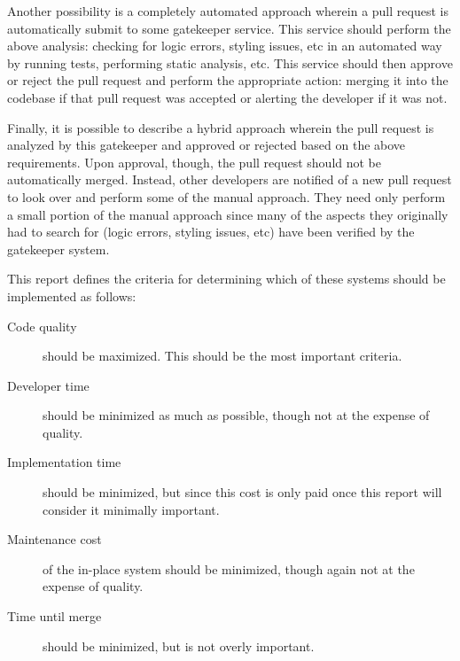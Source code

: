 \documentclass[12pt]{article}
\begin{document}
Another possibility is a completely automated approach wherein a pull request is automatically submit to some gatekeeper service. This service should perform the above analysis: checking for logic errors, styling issues, etc in an automated way by running tests, performing static analysis, etc. This service should then approve or reject the pull request and perform the appropriate action: merging it into the codebase if that pull request was accepted or alerting the developer if it was not.

Finally, it is possible to describe a hybrid approach wherein the pull request is analyzed by this gatekeeper and approved or rejected based on the above requirements. Upon approval, though, the pull request should not be automatically merged. Instead, other developers are notified of a new pull request to look over and perform some of the manual approach. They need only perform a small portion of the manual approach since many of the aspects they originally had to search for (logic errors, styling issues, etc) have been verified by the gatekeeper system.

This report defines the criteria for determining which of these systems should be implemented as follows:
\begin{description}
\item[Code quality] should be maximized. This should be the most important criteria.
\item[Developer time] should be minimized as much as possible, though not at the expense of quality.
\item[Implementation time] should be minimized, but since this cost is only paid once this report will consider it minimally important.
\item[Maintenance cost] of the in-place system should be minimized, though again not at the expense of quality.
\item[Time until merge] should be minimized, but is not overly important.
\end{description}
\end{document}
